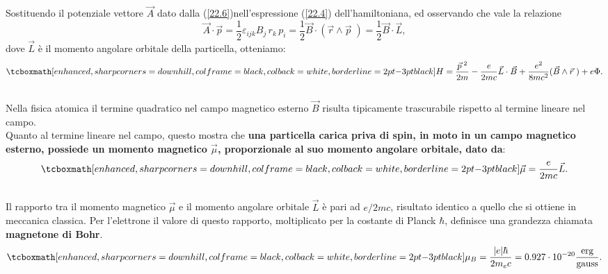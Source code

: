 \documentclass[a4paper,12pt,oneside]{book}
\begin{document}
Sostituendo il potenziale vettore $\vec{A}$ dato dalla (\ref{22.6})nell'espressione (\ref{22.4}) dell'hamiltoniana, ed osservando che vale la relazione
\begin{equation}
\vec{A}\cdot\vec{p}=\frac{1}{2}\varepsilon_{ijk}B_{j}\, r_{k}\, p_{i}=\frac{1}{2}\vec{B}\cdot(\vec{r}\wedge\vec{p}\;)=\frac{1}{2}\vec{B}\cdot\vec{L} ,
\end{equation}
dove $\vec{L}$ è il momento angolare orbitale della particella, otteniamo:
	\begin{equation}
		\tcboxmath[enhanced, sharp corners=downhill, colframe=black, colback=white, borderline={2pt}{-3pt}{black}]{
			H=\frac{\vec{p}^{\;2}}{2m}-\frac{e}{2mc}\vec{L}\cdot\vec{B}+\frac{e^{2}}{8mc^{2}}(\vec{B}\wedge\vec{r}\;)+e\Phi .
			}
	\label{22.10}
	\end{equation}\\
	
Nella fisica atomica il termine quadratico nel campo magnetico esterno $\vec{B}$ risulta tipicamente trascurabile rispetto al termine lineare nel campo.\\

Quanto al termine lineare nel campo, questo mostra che \textbf{una particella carica priva di spin, in moto in un campo magnetico esterno, possiede un momento magnetico $\vec{\mu}$, proporzionale al suo momento angolare orbitale, dato da}:
	\begin{equation}
		\tcboxmath[enhanced, sharp corners=downhill, colframe=black, colback=white, borderline={2pt}{-3pt}{black}]{
			\vec{\mu}=\frac{e}{2mc}\vec{L} .
			}
	\label{22.11}
	\end{equation}\\
	
Il rapporto tra il momento magnetico $\vec{\mu}$ e il momento angolare orbitale $\vec{L}$ è pari ad $e/2mc$, risultato identico a quello che si ottiene in meccanica classica. Per l'elettrone il valore di questo rapporto, moltiplicato per la costante di Planck $\hbar$, definisce una grandezza chiamata \textbf{magnetone di Bohr}.
	\begin{equation}
		\tcboxmath[enhanced, sharp corners=downhill, colframe=black, colback=white, borderline={2pt}{-3pt}{black}]{
			\mu_{B}=\frac{|e|\hbar}{2m_{e}c}=0.927\cdot10^{-20}\frac{\textrm{erg}}{\textrm{gauss}} .
			}
	\end{equation}\\
	
\end{document}
